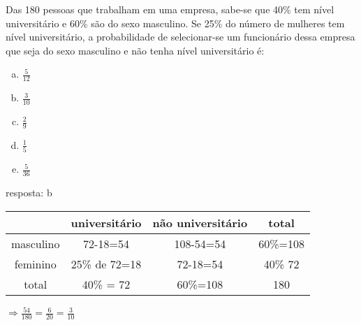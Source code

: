 \begin{ex}
Das 180 pessoas que trabalham em uma empresa, sabe-se que 40\% tem nível universitário e 60\% são do sexo masculino. Se 25\% do número de mulheres tem nível universitário, a probabilidade de selecionar-se um funcionário dessa empresa que seja do sexo masculino e não tenha nível universitário é:
   \begin{enumerate}[(a)]
   \item $\frac{5}{12}$
   \item $\frac{3}{10}$
   \item $\frac{2}{9}$
   \item $\frac{1}{5}$
   \item $\frac{5}{36}$
   \end{enumerate}
    \begin{sol}
     resposta: b \\
     \begin{tabular}{|c|c|c|c|} \hline
          & universitário & não universitário & total \\  \hline
   masculino  & 72-18=54 & 108-54=54 & 60\%=108 \\  \hline
   feminino & 25\% de 72=18 & 72-18=54 & 40\% 72  \\ \hline
   total & 40\% = 72 & 60\%=108 & 180 \\ \hline
     \end{tabular}
     $ \Longrightarrow \frac{54}{180}=\frac{6}{20}=\frac{3}{10}$
    \end{sol}
   
\end{ex}
